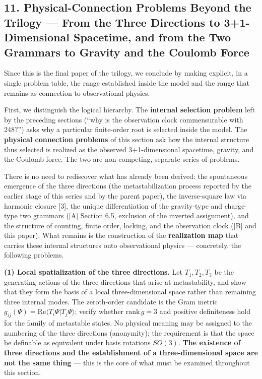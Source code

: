 \documentclass[
  a4paper,
]{article}
\begin{document}
\subsection{11. Physical-Connection Problems Beyond the Trilogy --- From
the Three Directions to 3+1-Dimensional Spacetime, and from the Two
Grammars to Gravity and the Coulomb
Force}\label{physical-connection-problems-beyond-the-trilogy-from-the-three-directions-to-31-dimensional-spacetime-and-from-the-two-grammars-to-gravity-and-the-coulomb-force}

Since this is the final paper of the trilogy, we conclude by making
explicit, in a single problem table, the range established inside the
model and the range that remains as connection to observational physics.

First, we distinguish the logical hierarchy. The \textbf{internal
selection problem} left by the preceding sections (``why is the
observation clock commensurable with 248?'') asks why a particular
finite-order root is selected inside the model. The \textbf{physical
connection problems} of this section ask how the internal structure thus
selected is realized as the observed 3+1-dimensional spacetime, gravity,
and the Coulomb force. The two are non-competing, separate series of
problems.

There is no need to rediscover what has already been derived: the
spontaneous emergence of the three directions (the metastabilization
process reported by the earlier stage of this series and by the parent
paper), the inverse-square law via harmonic closure {[}3{]}, the unique
differentiation of the gravity-type and charge-type two grammars
({[}A{]} Section 6.5, exclusion of the inverted assignment), and the
structure of counting, finite order, locking, and the observation clock
({[}B{]} and this paper). What remains is the construction of the
\textbf{realization map} that carries these internal structures onto
observational physics --- concretely, the following problems.

\textbf{(1) Local spatialization of the three directions.} Let
\(T_1,T_2,T_3\) be the generating actions of the three directions that
arise at metastability, and show that they form the basis of a local
three-dimensional space rather than remaining three internal modes. The
zeroth-order candidate is the Gram metric
\(g_{ij}(\Psi)=\mathrm{Re}\langle T_i\Psi|T_j\Psi\rangle\); verify
whether \(\mathrm{rank}\,g=3\) and positive definiteness hold for the
family of metastable states. No physical meaning may be assigned to the
numbering of the three directions (anonymity); the requirement is that
the space be definable as equivalent under basis rotations \(SO(3)\).
\textbf{The existence of three directions and the establishment of a
three-dimensional space are not the same thing} --- this is the core of
what must be examined throughout this section.
\end{document}
